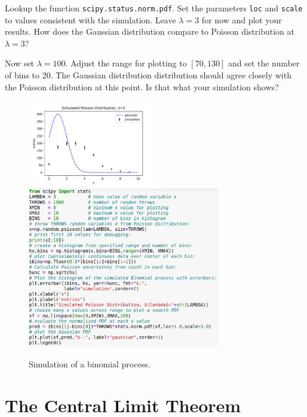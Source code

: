 \begin{plot} \end{plot}
Lookup the function {\tt scipy.status.norm.pdf}.  Set the parameters
{\tt loc} and {\tt scale} to values consistent with the simulation.
Leave $\lambda=3$ for now and plot your results.  How does the Gaussian distribution compare to Poisson distribution at $\lambda=3$?

\begin{plot} \end{plot}
Now set $\lambda=100$.  Adjust the range for plotting to $[70,130]$ and set the number of bins to 20.
The Gaussian distribution distribution should agree closely with the Poisson distribution at this point.  Is that what your simulation shows?

\begin{figure}[htbp]
\begin{center}
  \includegraphics[width=0.50\textwidth]{figs/labs/limits/poisson.pdf}
  \includegraphics[width=0.75\textwidth]{figs/labs/limits/poisson-code.png} 
\caption{Simulation of a binomial process.}
\label{fig:poisson}
\end{center}
\end{figure}


\section{The Central Limit Theorem}

